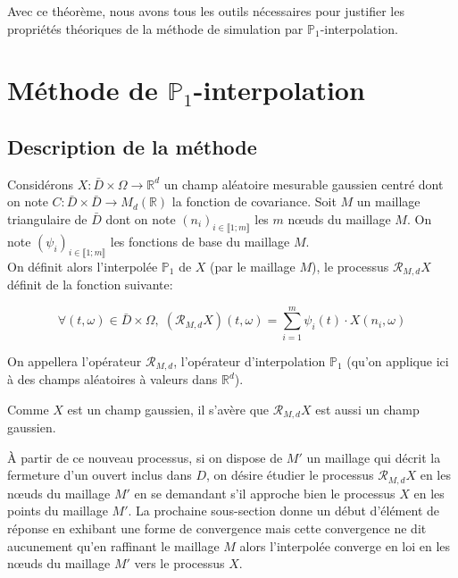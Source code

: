 Avec ce théorème, nous avons tous les outils nécessaires pour justifier les
propriétés théoriques de la méthode de simulation par $\mathbb{P}_1$-interpolation.

\section{Méthode de $\mathbb{P}_1$-interpolation}

\subsection{Description de la méthode}

Considérons $X: \bar{D} \times \Omega \rightarrow \mathbb{R}^d$ un champ
aléatoire mesurable gaussien centré dont on note
$C: \bar{D} \times \bar{D} \rightarrow M_d(\mathbb{R})$ la fonction de
covariance. Soit $M$ un maillage triangulaire de $\bar{D}$ dont on note $(n_i)_{i \in \llbracket 1;m \rrbracket}$ les $m$ n\oe uds du maillage $M$. On note $(\psi_i)_{i \in \llbracket 1;m \rrbracket}$ les fonctions de base du maillage $M$.\\

\noindent On définit alors l'interpolée $\mathbb{P}_1$ de $X$ (par le maillage $M$), le processus
$\mathcal{R}_{M,d}X$ définit de la fonction suivante: 

\begin{equation}
  \label{RFInterpol}
  \forall (t,\omega) \in \bar{D} \times \Omega, \; (\mathcal{R}_{M,d}X)(t,\omega) =  \displaystyle\sum_{i=1}^m \psi_i (t)\cdot X(n_i,\omega)
\end{equation}

\noindent On appellera l'opérateur $\mathcal{R}_{M,d}$, l'opérateur d'interpolation $\mathbb{P}_1$ (qu'on applique ici à des champs aléatoires à valeurs dans $\mathbb{R}^d$).
\begin{remark}
Comme $X$ est un champ gaussien, il s'avère que $\mathcal{R}_{M,d}X$ est aussi un champ gaussien.
\end{remark}

\` A partir de ce nouveau processus, si on dispose de $M'$ un maillage qui décrit la fermeture d'un ouvert inclus dans $D$, on désire étudier le
processus $\mathcal{R}_{M,d}X$ en les n\oe uds du maillage $M'$ en se demandant s'il
approche bien le processus $X$ en les points du maillage $M'$. La prochaine sous-section donne un début d'élément de réponse en exhibant
une forme de convergence mais cette convergence ne dit aucunement qu'en raffinant le maillage $M$ alors l'interpolée converge en loi en
les n\oe uds du maillage $M'$ vers le processus $X$.\\

